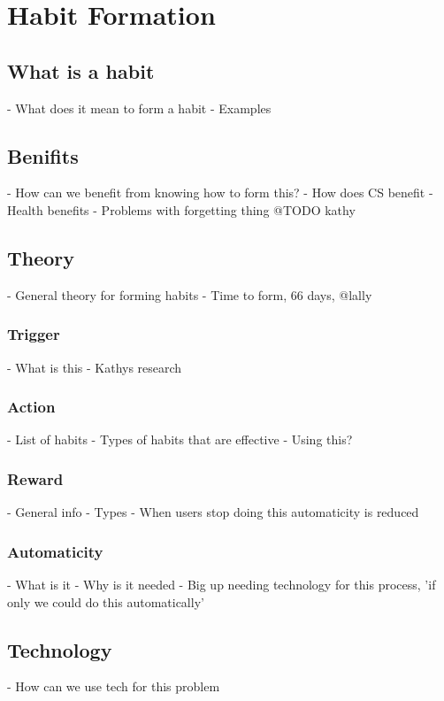 \newpage


\section{Habit Formation}

  \subsection*{What is a habit}



  - What does it mean to form a habit
    - Examples
  \subsection{Benifits}
    - How can we benefit from knowing how to form this?
    - How does CS benefit
      - Health benefits
      - Problems with forgetting thing @TODO kathy
  \subsection{Theory}
    - General theory for forming habits
    - Time to form, 66 days, @lally
  \subsubsection{Trigger}
      - What is this
      - Kathys research
  \subsubsection{Action}
      - List of habits
      - Types of habits that are effective
        - Using this?
  \subsubsection{Reward}
      - General info
      - Types
    - When users stop doing this automaticity is reduced
  \subsubsection{Automaticity}
      - What is it
      - Why is it needed
    - Big up needing technology for this process, 'if only we could do this automatically'

\newpage

  \subsection{Technology}
    - How can we use tech for this problem


